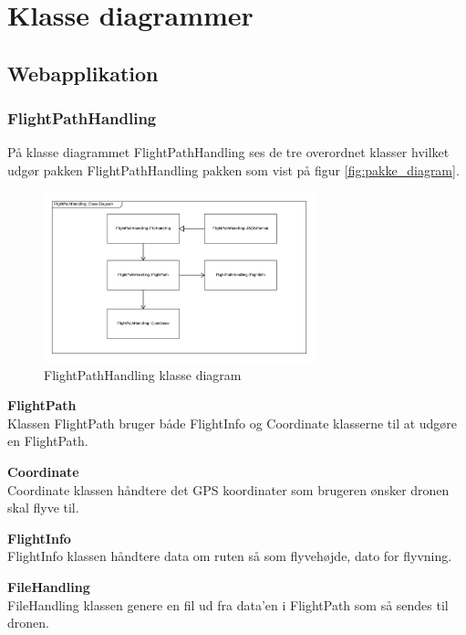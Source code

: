 \section{Klasse diagrammer}

\subsection{Webapplikation}

\subsubsection{FlightPathHandling}
På klasse diagrammet FlightPathHandling ses de tre overordnet klasser hvilket udgør pakken FlightPathHandling pakken som vist på figur \ref{fig:pakke_diagram}.

\vspace{-5pt}
\begin{figure}[H]
	\centering
	\includegraphics[width=0.7\textwidth]{Billeder/klasse_diagrammer/FlightPathHandlingDiagram.png}
	\vspace{-5pt}
	\caption{FlightPathHandling klasse diagram}
	\label{fig:FlightPathHandling_klasse_diagram}
\end{figure}

\textbf{FlightPath}\\
Klassen FlightPath bruger både FlightInfo og Coordinate klasserne til at udgøre en FlightPath.

\textbf{Coordinate}\\
Coordinate klassen håndtere det GPS koordinater som brugeren ønsker dronen skal flyve til.

\textbf{FlightInfo}\\
FlightInfo klassen håndtere data om ruten så som flyvehøjde, dato for flyvning.

\textbf{FileHandling}\\
FileHandling klassen genere en fil ud fra data'en i FlightPath som så sendes til dronen.

